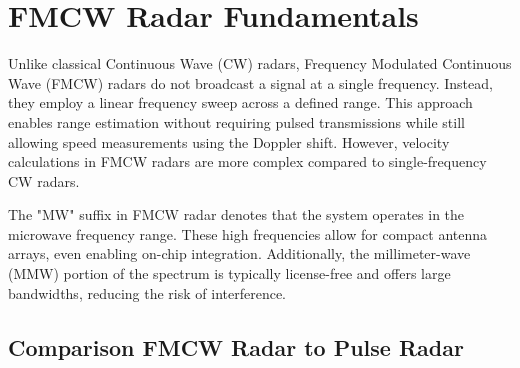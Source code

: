 \def\PageLayout{single-no-print}
\def\DocLanguage{en}
\def\PackagesIncludeTikz{yes}
\def\PackagesIncludeBib{yes}









\usepackage{pdfpages}

\newcommand{\sidar}{SiRad Easy\textsuperscript{\copyright} }
\newcommand{\boldred}[1]{\textbf{\textcolor{red}{#1}}}
\newcommand{\boldblue}[1]{\textbf{\textcolor{blue}{#1}}}






\tableofcontents

\newpage
{}
\setcounter{page}{1}





\pagestyle{fancy}

\chapter{FMCW Radar Fundamentals}

Unlike classical Continuous Wave (CW) radars, Frequency Modulated Continuous Wave (FMCW) radars do not broadcast a signal at a single frequency.
Instead, they employ a linear frequency sweep across a defined range.
This approach enables range estimation without requiring pulsed transmissions while still allowing speed measurements using the Doppler shift.
However, velocity calculations in FMCW radars are more complex compared to single-frequency CW radars.

The "MW" suffix in FMCW radar denotes that the system operates in the microwave frequency range.
These high frequencies allow for compact antenna arrays, even enabling on-chip integration.
Additionally, the millimeter-wave (MMW) portion of the spectrum is typically license-free \cite{spektrumCTU} and offers large bandwidths, reducing the risk of interference.

\section{Comparison FMCW Radar to Pulse Radar}

